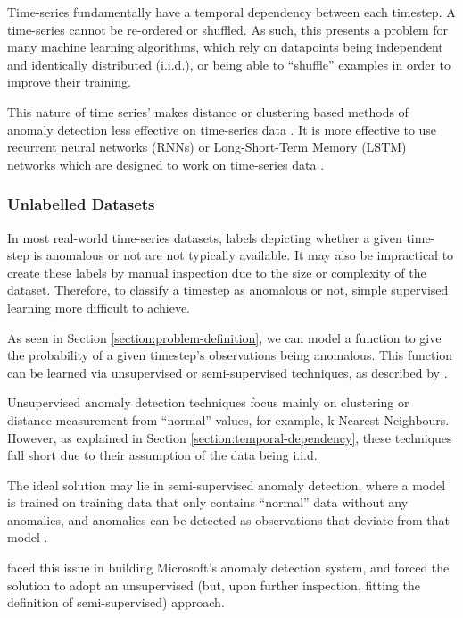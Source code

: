 \documentclass{mpaper}
\begin{document}
Time-series fundamentally have a temporal dependency between each timestep. A time-series cannot be re-ordered or shuffled. As such, this presents a problem for many machine learning algorithms, which rely on datapoints being independent and identically distributed (i.i.d.), or being able to ``shuffle'' examples in order to improve their training. 

This nature of time series' makes distance or clustering based methods of anomaly detection less effective on time-series data \citep{deepMultivariateNetwork}. It is more effective to use recurrent neural networks (RNNs) or Long-Short-Term Memory (LSTM) networks which are designed to work on time-series data \citep{deepMultivariateNetwork}.

\subsubsection{Unlabelled Datasets}
\label{section:unlabelled-datasets}

In most real-world time-series datasets, labels depicting whether a given time-step is anomalous or not are not typically available. It may also be impractical to create these labels by manual inspection due to the size or complexity of the dataset. Therefore, to classify a timestep as anomalous or not, simple supervised learning more difficult to achieve.

As seen in Section \ref{section:problem-definition}, we can model a function to give the probability of a given timestep's observations being anomalous. This function can be learned via unsupervised or semi-supervised techniques, as described by \cite{comparativeUnsupervisedEvaluation}. 

Unsupervised anomaly detection techniques focus mainly on clustering or distance measurement from ``normal'' values, for example, k-Nearest-Neighbours. However, as explained in Section \ref{section:temporal-dependency}, these techniques fall short due to their assumption of the data being i.i.d.

The ideal solution may lie in semi-supervised anomaly detection, where a model is trained on training data that only contains ``normal'' data without any anomalies, and anomalies can be detected as observations that deviate from that model \citep{comparativeUnsupervisedEvaluation}.

\cite{MicrosoftTimeSeries} faced this issue in building Microsoft's anomaly detection system, and forced the solution to adopt an unsupervised (but, upon further inspection, fitting the definition of semi-supervised) approach.
\end{document}
